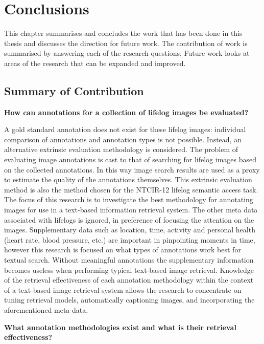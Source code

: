 \chapter{Conclusions}

This chapter summarises and concludes the work that has been done in this thesis and discusses the direction for future work. The contribution of work is summarised by answering each of the research questions. Future work looks at areas of the research that can be expanded and improved.

\section{Summary of Contribution}

\textbf{How can annotations for a collection of lifelog images be evaluated?}

A gold standard annotation does not exist for these lifelog images: individual comparison of annotations and annotation types is not possible. Instead, an alternative extrinsic evaluation methodology is considered. The problem of evaluating image annotations is cast to that of searching for lifelog images based on the collected annotations. In this way image search results are used as a proxy to estimate the quality of the annotations themselves. This extrinsic evaluation method is also the method chosen for the NTCIR-12 lifelog semantic access task. The focus of this research is to investigate the best methodology for annotating images for use in a text-based information retrieval system. The other meta data associated with lifelogs is ignored, in preference of focusing the attention on the images. Supplementary data such as location, time, activity and personal health (heart rate, blood pressure, etc.) are important in pinpointing moments in time, however this research is focused on what types of annotations work best for textual search. Without meaningful annotations the supplementary information becomes useless when performing typical text-based image retrieval. Knowledge of the retrieval effectiveness of each annotation methodology within the context of a text-based image retrieval system allows the research to concentrate on tuning retrieval models, automatically captioning images, and incorporating the aforementioned meta data. 

\textbf{What annotation methodologies exist and what is their retrieval effectiveness?}

